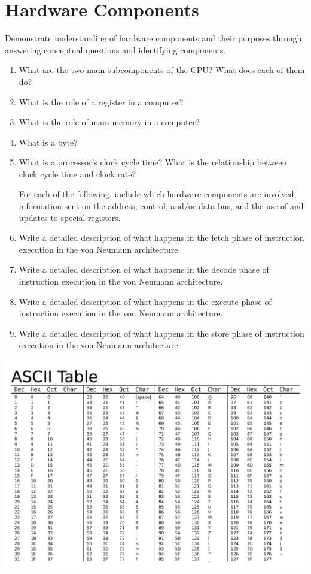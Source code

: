\documentclass[12pt]{article}
\begin{document}
\vfill

\standardsfooter

\newpage



\section*{Hardware Components}

Demonstrate understanding of hardware components and their purposes through answering conceptual questions and identifying components.

\begin{enumerate}
\item What are the two main subcomponents of the CPU? What does each of them do?
\vfill
\item What is the role of a register in a computer?
\vfill
\item What is the role of main memory in a computer?
\vfill
\item What is a byte?
\vfill
\item What is a processor's clock cycle time? What is the relationship between clock cycle time and clock rate?
\vfill

\pagebreak

For each of the following, include which hardware components are involved, information sent on the address, control, and/or data bus, and the use of and updates to special registers.
\item Write a detailed description of what happens in the fetch phase of instruction execution in the von Neumann architecture.
\vfill
\item Write a detailed description of what happens in the decode phase of instruction execution in the von Neumann architecture.
\vfill
\item Write a detailed description of what happens in the execute phase of instruction execution in the von Neumann architecture.
\vfill
\item Write a detailed description of what happens in the store phase of instruction execution in the von Neumann architecture.
\vfill
\end{enumerate}

\vfill

\standardsfooter


\newpage

\includegraphics[height=\textheight]{ascii-table.png}
\end{document}
